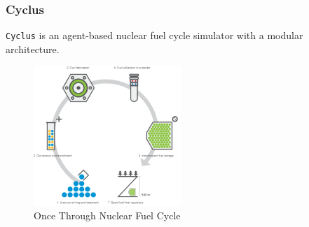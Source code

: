 \begin{frame}
    \frametitle{Cyclus}
        \texttt{Cyclus} is an agent-based nuclear fuel cycle simulator with a modular architecture.
     \\   
    \begin{figure}[htbp!]
      \begin{center}
        \includegraphics[height=5.3cm]{../figures/nfc}
      \end{center}
            \caption{Once Through Nuclear Fuel Cycle \cite{noauthor_nuclear_nodate}}
      \label{fig:cyclus-modular}
    \end{figure}
  \end{frame}
  